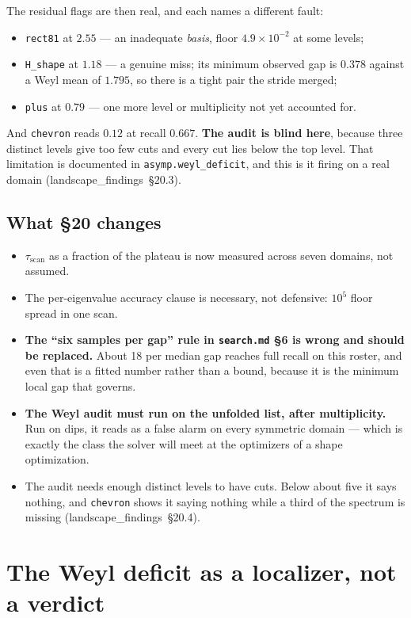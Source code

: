 \documentclass[11pt]{article}
\newcommand{\file}[1]{\texttt{#1}}
\newcommand{\lf}[1]{(landscape\_findings~\S#1)}
\begin{document}
The residual flags are then real, and each names a different fault:
\begin{itemize}[nosep]
\item \file{rect81} at $2.55$ --- an inadequate \emph{basis}, floor $4.9\times10^{-2}$ at some
  levels;
\item \file{H\_shape} at $1.18$ --- a genuine miss; its minimum observed gap is $0.378$ against a
  Weyl mean of $1.795$, so there is a tight pair the stride merged;
\item \file{plus} at $0.79$ --- one more level or multiplicity not yet accounted for.
\end{itemize}

And \file{chevron} reads $0.12$ at recall $0.667$. \textbf{The audit is blind here}, because
three distinct levels give too few cuts and every cut lies below the top level. That limitation
is documented in \verb|asymp.weyl_deficit|, and this is it firing on a real domain \lf{20.3}.

\subsection{What \S20 changes}

\begin{itemize}[nosep]
\item $\tau_{\mathrm{scan}}$ as a fraction of the plateau is now measured across seven domains,
  not assumed.
\item The per-eigenvalue accuracy clause is necessary, not defensive: $10^5$ floor spread in one
  scan.
\item \textbf{The ``six samples per gap'' rule in \file{search.md} \S6 is wrong and should be
  replaced.} About 18 per median gap reaches full recall on this roster, and even that is a
  fitted number rather than a bound, because it is the minimum local gap that governs.
\item \textbf{The Weyl audit must run on the unfolded list, after multiplicity.} Run on dips, it
  reads as a false alarm on every symmetric domain --- which is exactly the class the solver will
  meet at the optimizers of a shape optimization.
\item The audit needs enough distinct levels to have cuts. Below about five it says nothing, and
  \file{chevron} shows it saying nothing while a third of the spectrum is missing \lf{20.4}.
\end{itemize}

\section{The Weyl deficit as a localizer, not a verdict}
\label{sec:localizer}
\end{document}
